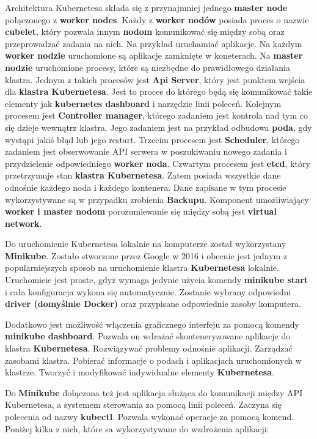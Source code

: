 \documentclass{iiuwb}
\begin{document}
Architektura Kubernetesa składa się z przynajmniej 
jednego \textbf{master node} połączonego z \textbf{worker
nodes}. Każdy z \textbf{worker nodów} posiada proces 
o nazwie \textbf{cubelet}, który pozwala innym \textbf{nodom}
komunikować się między sobą oraz przeprowadzać zadania na nich.
Na przykład uruchamiać aplikacje. Na każdym \textbf{worker
nodzie} uruchomione są aplikacje zamknięte w koneterach. 
Na \textbf{master nodzie} uruchomione procesy, które są
niezbędne do prawidłowego działania klastra. Jednym z takich
procesów jest \textbf{Api Server}, który jest punktem wejścia
dla \textbf{klastra Kubernetesa}. Jest to proces do którego 
będą się komunikować takie elementy jak \textbf{kubernetes 
dashboard} i narzędzie linii poleceń. Kolejnym procesem jest
\textbf{Controller manager}, którego zadaniem jest kontrola 
nad tym co się dzieje wewnątrz klastra. Jego zadaniem jest
na przykład odbudowa \textbf{poda}, gdy wystąpi jakiś błąd lub
jego restart. Trzecim procesem jest \textbf{Scheduler}, którego
zadaniem jest obserwowanie API serwera w poszukiwaniu nowego
zadania i przydzielenie odpowiedniego \textbf{worker noda}.
Czwartym procesem jest \textbf{etcd}, który przetrzymuje stan
\textbf{klastra Kubernetesa}. Zatem posiada wszystkie dane 
odnośnie każdego noda i każdego kontenera. Dane zapisane w tym
procesie wykorzystywane są w przypadku zrobienia 
\textbf{Backupu}. Komponent umożliwiający \textbf{worker i master 
nodom} porozumiewanie się między sobą jest \textbf{virtual network}.

Do uruchomienie Kubernetesa lokalnie na komputerze został 
wykorzystany \textbf{Minikube}. Zostało stworzone przez
Google w 2016 i obecnie jest jednym z popularniejszych 
sposob na uruchomienie klastra \textbf{Kubernetesa} 
lokalnie. Uruchomieie jest proste, gdyż wymaga jedynie 
użycia komendy \textbf{minikube start} i cała konfiguracja
wykona się automatycznie. Zostanie wybrany odpowiedni 
\textbf{driver (domyślnie Docker)} oraz przypisane 
odpowiednie zasoby komputera. 

Dodatkowo jest możliwość włączenia graficznego interfeju
za pomocą komendy \textbf{minikube dashboard}. Pozwala on 
wdrażać skonteneryzowane aplikacje do klastra 
\textbf{Kubernetesa}. Rozwiązywać problemy odnośnie 
aplikacji. Zarządzać zasobami klastra. Pobierać informacje 
o podach i aplikacjach uruchomionych w klastrze. Tworzyć 
i modyfikować indywidualne elementy \textbf{Kubernetesa}.

Do \textbf{Minikube} dołączona też jest aplikacja
służąca do komunikacji między API Kubernetesa, a systemem 
sterowania za pomocą linii poleceń. Zaczyna się polecenia
od nazwy \textbf{kubectl}. Pozwala wykonać operacje 
za pomocą komend. Poniżej kilka z nich, które sa 
wykorzystywane do wzdrożenia aplikacji:
\end{document}
